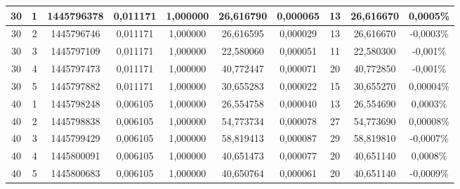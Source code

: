 \begin{landscape}
\begin{center}
\begin{table}[htbp]
\begin{tabular}{cccccccccc}
\hline
        30 &          1 & 1445796378 &   0,011171 &   1,000000 &  26,616790 &   0,000065 &         13 &  26,616670 &   0,0005\% \\
\hline
        30 &          2 & 1445796746 &   0,011171 &   1,000000 &  26,616595 &   0,000029 &         13 &  26,616670 &  -0,0003\% \\
\hline
        30 &          3 & 1445797109 &   0,011171 &   1,000000 &  22,580060 &   0,000051 &         11 &  22,580300 &   -0,001\% \\
\hline
        30 &          4 & 1445797473 &   0,011171 &   1,000000 &  40,772447 &   0,000071 &         20 &  40,772850 &   -0,001\% \\
\hline
        30 &          5 & 1445797882 &   0,011171 &   1,000000 &  30,655283 &   0,000022 &         15 &  30,655270 &  0,00004\% \\
\hline
        40 &          1 & 1445798248 &   0,006105 &   1,000000 &  26,554758 &   0,000040 &         13 &  26,554690 &   0,0003\% \\
\hline
        40 &          2 & 1445798838 &   0,006105 &   1,000000 &  54,773734 &   0,000078 &         27 &  54,773690 &  0,00008\% \\
\hline
        40 &          3 & 1445799429 &   0,006105 &   1,000000 &  58,819413 &   0,000087 &         29 &  58,819810 &  -0,0007\% \\
\hline
        40 &          4 & 1445800091 &   0,006105 &   1,000000 &  40,651473 &   0,000077 &         20 &  40,651140 &   0,0008\% \\
\hline
        40 &          5 & 1445800683 &   0,006105 &   1,000000 &  40,650764 &   0,000061 &         20 &  40,651140 &  -0,0009\% \\
\hline \hline
\end{tabular}
\end{table}  
\end{center}
\end{landscape}

\newpage

